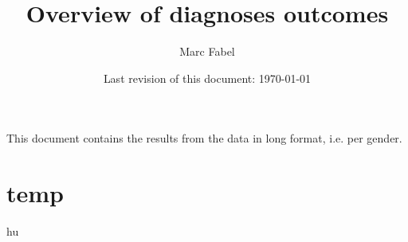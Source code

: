 \documentclass{scrartcl} %
\author{Marc Fabel}
\title{Overview of diagnoses outcomes}
\date{Last revision of this document: \today}
\begin{document}
\maketitle
This document contains the results from the data in long format, i.e. per gender.

\newpage


\section{temp}



%
%
%
%
\newpage
hu
\newpage
\end{document}
